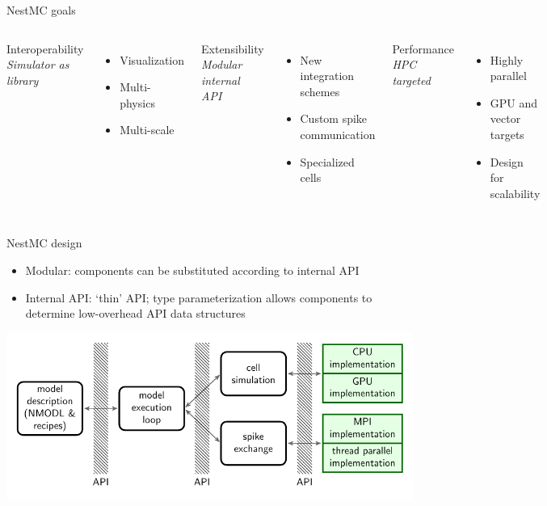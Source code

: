 \documentclass[aspectratio=1610,14pt]{beamer}
\begin{document}
\begin{frame}{NestMC goals}
  \vfill
  \begin{columns}[t,onlytextwidth]
    \centering Interoperability
    \\[2ex]
    \small
    {\em Simulator as library}
    \\
    \begin{itemize}
      \small
      \setlength{\itemsep}{0.2ex}
    \item Visualization
    \item Multi-physics
    \item Multi-scale
    \end{itemize}

    \centering Extensibility
    \\[2ex]
    \small
    {\em Modular internal API}
    \\
    \begin{itemize}
      \small
      \setlength{\itemsep}{0.2ex}
    \item New integration schemes
    \item Custom spike communication
    \item Specialized cells
    \end{itemize}

    \centering Performance
    \\[2ex]
    \small
    {\em HPC targeted}
    \begin{itemize}
      \small
      \setlength{\itemsep}{0.2ex}
    \item Highly parallel
    \item GPU and vector targets
    \item Design for scalability
    \end{itemize}
  \end{columns}
  \vspace{4ex}
\end{frame}

\begin{frame}{NestMC design}
  \begin{itemize}
  \item Modular: components can be substituted according to internal API
  \item Internal API: `thin' API; type parameterization allows components to determine low-overhead API data structures
  \end{itemize}
  \begin{center}
    \includegraphics[width=.9\textwidth]{figs/api.pdf}
  \end{center}
\end{frame}
\end{document}
